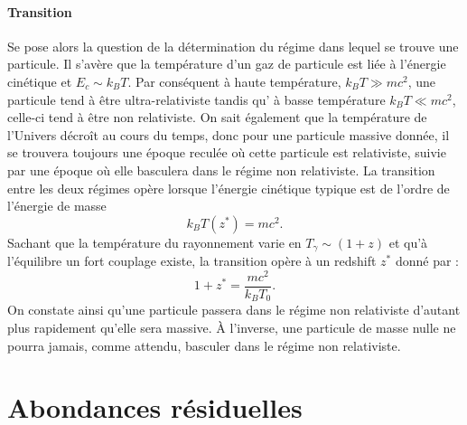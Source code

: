 \paragraph{Transition}
Se pose alors la question de la détermination du régime dans lequel se trouve une particule. Il s'avère que la température d'un gaz de particule est liée à l'énergie cinétique et $E_c\sim k_B T$. Par conséquent à haute température, $k_B T\gg mc^2$, une particule tend à être ultra-relativiste tandis qu' à basse température $k_B T\ll mc^2$, celle-ci tend à être non relativiste. On sait également que la température de l'Univers décroît au cours du temps, donc pour une particule massive donnée, il se trouvera toujours une époque reculée où cette particule est relativiste, suivie par une époque où elle basculera dans le régime non relativiste. La transition entre les deux régimes opère lorsque l'énergie cinétique typique est de l'ordre de l'énergie de masse
\begin{equation}
k_B T(z^*)=mc^2.
\end{equation}
Sachant que la température du rayonnement varie en $T_\gamma\sim (1+z)$ et qu'à l'équilibre un fort couplage existe, la transition opère à un redshift $z^*$ donné par :
\begin{equation}
1+z^*=\frac{mc^2}{k_B T_0}.
\end{equation}
 On constate ainsi qu'une particule passera dans le régime non relativiste d'autant plus rapidement qu'elle sera massive. À l'inverse, une particule de masse nulle ne pourra jamais, comme attendu, basculer dans le régime non relativiste.
 

 
 \section{Abondances résiduelles}
 
